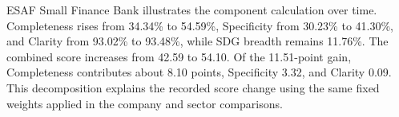 ESAF Small Finance Bank illustrates the component calculation over time. Completeness rises from 34.34\% to 54.59\%, Specificity from 30.23\% to 41.30\%, and Clarity from 93.02\% to 93.48\%, while SDG breadth remains 11.76\%. The combined score increases from 42.59 to 54.10. Of the 11.51-point gain, Completeness contributes about 8.10 points, Specificity 3.32, and Clarity 0.09. This decomposition explains the recorded score change using the same fixed weights applied in the company and sector comparisons.

\FloatBarrier
